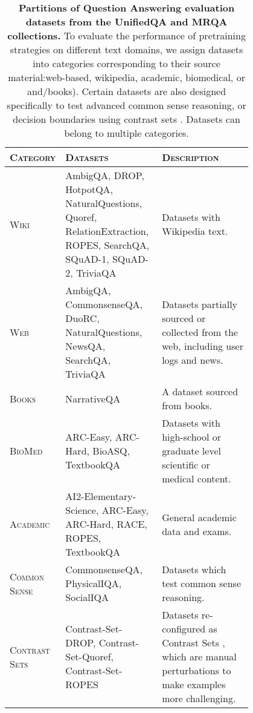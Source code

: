 
\begingroup
\setlength{\tabcolsep}{4pt}
\begin{table*}[ht]
    \centering
    \small
    \caption{
    \textbf{Partitions of Question Answering evaluation datasets from the UnifiedQA \citep{khashabi-etal-2020-unifiedqa} and MRQA \citep{fisch2019mrqa} collections.} To evaluate the performance of pretraining strategies on different text domains, we assign datasets into categories corresponding to their source material:web-based, wikipedia, academic, biomedical, or and/books). Certain datasets are also designed specifically to test advanced common sense reasoning, or decision boundaries using contrast sets \citep{gardner2020evaluating}. Datasets can belong to multiple categories.}
    \begin{tabular}{l | p{0.4\linewidth} p{0.4\linewidth}}
    \toprule
    \textsc{Category} & \textsc{Datasets} & \textsc{Description} \\
    \midrule
    \textsc{Wiki} & AmbigQA, DROP, HotpotQA, NaturalQuestions, Quoref, RelationExtraction, ROPES, SearchQA, SQuAD-1, SQuAD-2, TriviaQA  & Datasets with Wikipedia text. \\
    \textsc{Web} & AmbigQA, CommonsenseQA, DuoRC, NaturalQuestions, NewsQA, SearchQA, TriviaQA  & Datasets partially sourced or collected from the web, including user logs and news.  \\
    \textsc{Books} & NarrativeQA  & A dataset sourced from books. \\
    \textsc{BioMed} & ARC-Easy, ARC-Hard, BioASQ, TextbookQA  & Datasets with high-school or graduate level scientific or medical content. \\
    \textsc{Academic} & AI2-Elementary-Science, ARC-Easy, ARC-Hard, RACE, ROPES, TextbookQA & General academic data and exams. \\
    \midrule
    \textsc{Common Sense} & CommonsenseQA, PhysicalIQA, SocialIQA & Datasets which test common sense reasoning. \\
    \textsc{Contrast Sets} & Contrast-Set-DROP, Contrast-Set-Quoref, Contrast-Set-ROPES & Datasets re-configured as Contrast Sets \citep{gardner2020evaluating}, which are manual perturbations to make examples more challenging.\\
    \bottomrule
    \end{tabular}
    \label{tab:qa-partitions}
\end{table*}
\endgroup

